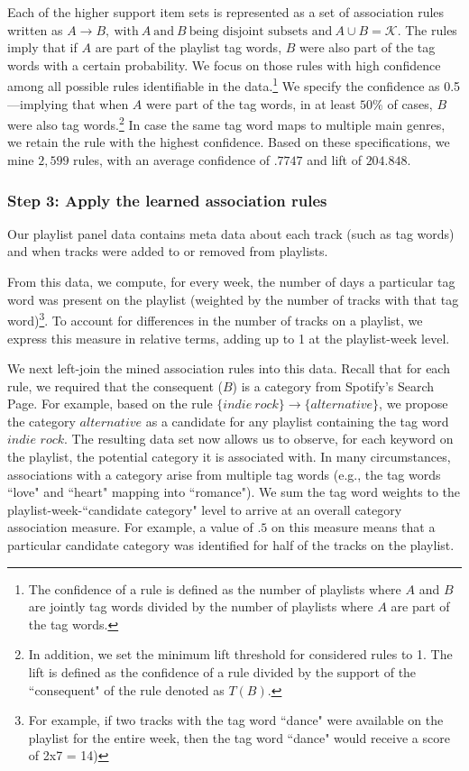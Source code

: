 Each of the higher support item sets is represented as a set of association rules written as 
$A \rightarrow B, \ \text{with}\ A \ \text{and}\ B\ \text{being disjoint subsets and}\ A  \cup B = \mathcal{K}$. The rules imply that if $A$ are part of the playlist tag words, $B$ were also part of the tag words with a certain probability. We focus on those rules with high confidence among all possible rules identifiable in the data.\footnote{The confidence of a rule is defined as the number of playlists where $A$ and $B$ are jointly tag words divided by the number of playlists where $A$ are part of the tag words.} We specify the confidence as 0.5---implying that when $A$ were part of the tag words, in at least $50\%$ of cases, $B$ were also tag words.\footnote{In addition, we set the minimum lift threshold for considered rules to 1. The lift is defined as the confidence of a rule divided by the support of the ``consequent" of the rule denoted as $T(B)$.} In case the same tag word maps to multiple main genres, we retain the rule with the highest confidence.
Based on these specifications, we mine $2,599$ rules, with an average confidence of $.7747$ and lift of $204.848$.

\subsubsection*{Step 3: Apply the learned association rules}

Our playlist panel data contains meta data about each track (such as tag words) and when tracks were added to or removed from playlists.

From this data, we compute, for every week, the number of days a particular tag word was present on the playlist (weighted by the number of tracks with that tag word)\footnote{For example, if two tracks with the tag word ``dance" were available on the playlist for the entire week, then the tag word ``dance" would receive a score of 2x7 = 14)}. To account for differences in the number of tracks on a playlist, we express this measure in relative terms, adding up to 1 at the playlist-week level.

We next left-join the mined association rules into this data. Recall that for each rule, we required that the consequent ($B$) is a category from Spotify's Search Page. For example, based on the rule $\{indie\ rock\} \rightarrow  \{alternative\}$, we propose the category $alternative$ as a candidate for any playlist containing the tag word $indie$ $rock$. The resulting data set now allows us to observe, for each keyword on the playlist, the potential category it is associated with. In many circumstances, associations with a category arise from multiple tag words (e.g., the tag words ``love" and ``heart" mapping into ``romance"). We sum the tag word weights to the playlist-week-``candidate category" level to arrive at an overall category association measure. For example, a value of $.5$ on this measure means that a particular candidate category was identified for half of the tracks on the playlist.

